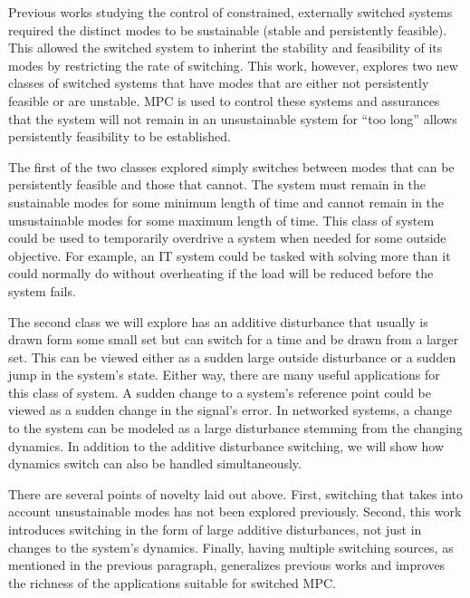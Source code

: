 Previous works studying the control of constrained, externally switched systems required the distinct modes to be sustainable (stable and persistently feasible). This allowed the switched system to inherint the stability and feasibility of its modes by restricting the rate of switching. This work, however, explores two new classes of switched systems that have modes that are either not persistently feasible or are unstable.  \Ac{MPC} is used to control these systems and assurances that the system will not remain in an unsustainable system for ``too long'' allows persistently feasibility to be established.

The first of the two classes explored simply switches between modes that can be persistently feasible and those that cannot. The system must remain in the sustainable modes for some minimum length of time and cannot remain in the unsustainable modes for some maximum length of time. This class of system could be used to temporarily overdrive a system when needed for some outside objective. For example, an IT system could be tasked with solving more than it could normally do without overheating if the load will be reduced before the system fails.

The second class we will explore has an additive disturbance that usually is drawn form some small set but can switch for a time and be drawn from a larger set. This can be viewed either as a sudden large outside disturbance or a sudden jump in the system's state. Either way, there are many useful applications for this class of system. A sudden change to a system's reference point could be viewed as a sudden change in the signal's error. In networked systems, a change to the system can be modeled as a large disturbance stemming from the changing dynamics. In addition to the additive disturbance switching, we will show how dynamics switch can also be handled simultaneously.

There are several points of novelty laid out above. First, switching that takes into account unsustainable modes has not been explored previously. Second, this work introduces switching in the form of large additive disturbances, not just in changes to the system's dynamics. Finally, having multiple switching sources, as mentioned in the previous paragraph, generalizes previous works and improves the richness of the applications suitable for switched \Ac{MPC}.

